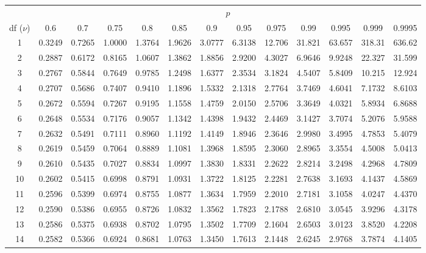 \begin{table}[htbp]
	\centering
	\setlength{\tabcolsep}{7pt}
	\begin{tabular}{ccccccccccccc}
		& \multicolumn{12}{c}{$p$}\\
		\cline{2-13}
		df ($\nu$) & 0.6 & 0.7 & 0.75 & 0.8 & 0.85 & 0.9 & 0.95 & 0.975 & 0.99 & 0.995 & 0.999 & 0.9995 \\
		\hline
		1 & 0.3249 & 0.7265 & 1.0000 & 1.3764 & 1.9626 & 3.0777 & 6.3138 & 12.706 & 31.821 & 63.657 & 318.31 & 636.62 \\
		2 & 0.2887 & 0.6172 & 0.8165 & 1.0607 & 1.3862 & 1.8856 & 2.9200 & 4.3027 & 6.9646 & 9.9248 & 22.327 & 31.599 \\
		3 & 0.2767 & 0.5844 & 0.7649 & 0.9785 & 1.2498 & 1.6377 & 2.3534 & 3.1824 & 4.5407 & 5.8409 & 10.215 & 12.924 \\
		4 & 0.2707 & 0.5686 & 0.7407 & 0.9410 & 1.1896 & 1.5332 & 2.1318 & 2.7764 & 3.7469 & 4.6041 & 7.1732 & 8.6103 \\
		5 & 0.2672 & 0.5594 & 0.7267 & 0.9195 & 1.1558 & 1.4759 & 2.0150 & 2.5706 & 3.3649 & 4.0321 & 5.8934 & 6.8688 \\
		6 & 0.2648 & 0.5534 & 0.7176 & 0.9057 & 1.1342 & 1.4398 & 1.9432 & 2.4469 & 3.1427 & 3.7074 & 5.2076 & 5.9588 \\
		7 & 0.2632 & 0.5491 & 0.7111 & 0.8960 & 1.1192 & 1.4149 & 1.8946 & 2.3646 & 2.9980 & 3.4995 & 4.7853 & 5.4079 \\
		8 & 0.2619 & 0.5459 & 0.7064 & 0.8889 & 1.1081 & 1.3968 & 1.8595 & 2.3060 & 2.8965 & 3.3554 & 4.5008 & 5.0413 \\
		9 & 0.2610 & 0.5435 & 0.7027 & 0.8834 & 1.0997 & 1.3830 & 1.8331 & 2.2622 & 2.8214 & 3.2498 & 4.2968 & 4.7809 \\[5pt]
		10 & 0.2602 & 0.5415 & 0.6998 & 0.8791 & 1.0931 & 1.3722 & 1.8125 & 2.2281 & 2.7638 & 3.1693 & 4.1437 & 4.5869 \\
		11 & 0.2596 & 0.5399 & 0.6974 & 0.8755 & 1.0877 & 1.3634 & 1.7959 & 2.2010 & 2.7181 & 3.1058 & 4.0247 & 4.4370 \\
		12 & 0.2590 & 0.5386 & 0.6955 & 0.8726 & 1.0832 & 1.3562 & 1.7823 & 2.1788 & 2.6810 & 3.0545 & 3.9296 & 4.3178 \\
		13 & 0.2586 & 0.5375 & 0.6938 & 0.8702 & 1.0795 & 1.3502 & 1.7709 & 2.1604 & 2.6503 & 3.0123 & 3.8520 & 4.2208 \\
		14 & 0.2582 & 0.5366 & 0.6924 & 0.8681 & 1.0763 & 1.3450 & 1.7613 & 2.1448 & 2.6245 & 2.9768 & 3.7874 & 4.1405 \\

\end{tabular}
\end{table}
